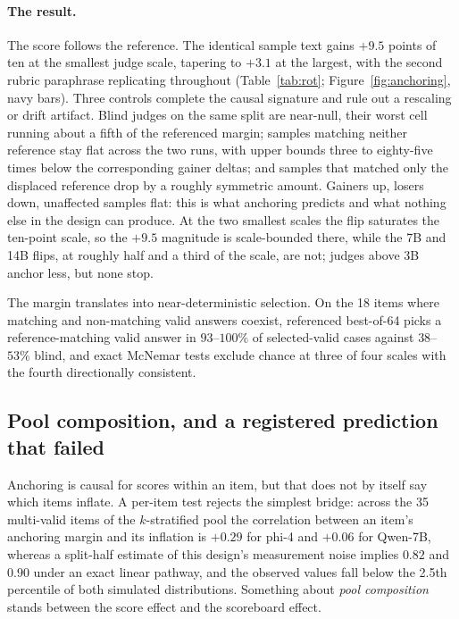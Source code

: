 \documentclass[11pt]{article}
\begin{document}
\paragraph{The result.}
The score follows the reference.
The identical sample text gains $+9.5$ points of ten at the smallest judge scale, tapering to $+3.1$ at the largest, with the second rubric paraphrase replicating throughout (Table~\ref{tab:rot}; Figure~\ref{fig:anchoring}, navy bars).
Three controls complete the causal signature and rule out a rescaling or drift artifact.
Blind judges on the same split are near-null, their worst cell running about a fifth of the referenced margin; samples matching neither reference stay flat across the two runs, with upper bounds three to eighty-five times below the corresponding gainer deltas; and samples that matched only the displaced reference drop by a roughly symmetric amount.
Gainers up, losers down, unaffected samples flat: this is what anchoring predicts and what nothing else in the design can produce.
At the two smallest scales the flip saturates the ten-point scale, so the $+9.5$ magnitude is scale-bounded there, while the 7B and 14B flips, at roughly half and a third of the scale, are not; judges above 3B anchor less, but none stop.

The margin translates into near-deterministic selection.
On the 18 items where matching and non-matching valid answers coexist, referenced best-of-64 picks a reference-matching valid answer in $93$--$100\%$ of selected-valid cases against $38$--$53\%$ blind, and exact McNemar tests exclude chance at three of four scales with the fourth directionally consistent.

\subsection{Pool composition, and a registered prediction that failed}
\label{sec:dose}

Anchoring is causal for scores within an item, but that does not by itself say which items inflate.
A per-item test rejects the simplest bridge: across the 35 multi-valid items of the $k$-stratified pool the correlation between an item's anchoring margin and its inflation is $+0.29$ for phi-4 and $+0.06$ for Qwen-7B, whereas a split-half estimate of this design's measurement noise implies $0.82$ and $0.90$ under an exact linear pathway, and the observed values fall below the 2.5th percentile of both simulated distributions.
Something about \emph{pool composition} stands between the score effect and the scoreboard effect.
\end{document}
